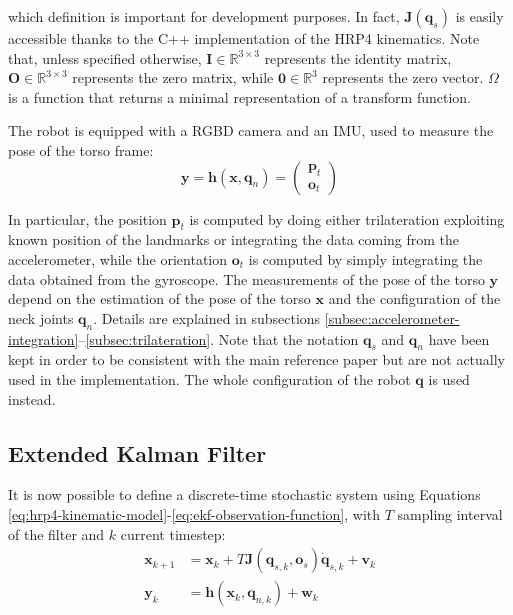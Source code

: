 \documentclass[a4paper]{article}
\begin{document}
\noindent which definition is important for development purposes.
In fact, $\bm{J}(\bm{q}_s)$ is easily accessible thanks to the
C++ implementation of the HRP4 kinematics. Note that, unless
specified otherwise, $\bm{I} \in \mathbb{R}^{3 \times 3}$
represents the identity matrix,
$\bm{O} \in \mathbb{R}^{3 \times 3}$
represents the zero matrix, while $\bm{0} \in \mathbb{R}^{3}$
represents the zero vector. $\bm{\varOmega}$ is a function that
returns a minimal representation of a transform function.

The robot is equipped with a RGBD camera and an IMU, used
to measure the pose of the torso frame:
\begin{equation}
\label{eq:ekf-observation-function}
    \bm{y} = \bm{h}(\bm{x}, \bm{q}_n) =
        \begin{pmatrix}
            \bm{p}_t \\
            \bm{o}_t
        \end{pmatrix}
\end{equation}

In particular, the position $\bm{p}_t$ is computed by doing either
trilateration exploiting known position of the landmarks or integrating the
data coming from the accelerometer, while
the orientation $\bm{o}_t$ is computed by simply integrating
the data obtained from the gyroscope. The measurements of the pose of the
torso $\bm{y}$ depend on the estimation of the pose of the torso $\bm{x}$ and the
configuration of the neck joints $\bm{q}_n$. Details are explained in
subsections \ref{subsec:accelerometer-integration}--\ref{subsec:trilateration}.
Note that the notation $\bm{q}_s$ and $\bm{q}_n$ have been kept in order to
be consistent with the main reference paper but are not actually used in
the implementation. The whole configuration of the robot $\bm{q}$ is used instead.

\subsection{Extended Kalman Filter}
\label{subsec:ekf}
It is now possible to define a discrete-time stochastic system
using Equations \ref{eq:hrp4-kinematic-model}-\ref{eq:ekf-observation-function},
with $T$ sampling
interval of the filter and $k$ current timestep:
\begin{align}
    \bm{x}_{k+1} &= \bm{x}_k + T \bm{J}(\bm{q}_{s,k}, \bm{o}_s) \bm{\dot{q}}_{s,k} + \bm{v}_k \\
    \bm{y}_k &= \bm{h}(\bm{x}_k, \bm{q}_{n,k}) + \bm{w}_k
\end{align}
\end{document}
